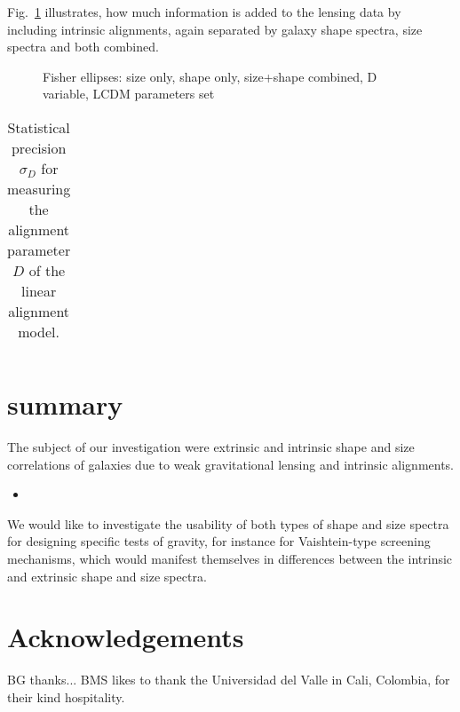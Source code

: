 \documentclass[a4paper,fleqn,usenatbib]{mnras}
\begin{document}
Fig.~\ref{fig:fisher2} illustrates, how much information is added to the lensing data by including intrinsic alignments, again separated by galaxy shape spectra, size spectra and both combined.

\begin{figure}
\centering
\caption{Fisher ellipses: size only, shape only, size+shape combined, D variable, LCDM parameters set}
\label{fig:fisher2}
\end{figure}


\begin{table}
\begin{center}
\begin{tabular}{cc}
\hline\hline\\
\hline
\end{tabular}
\caption{Statistical precision $\sigma_D$ for measuring the alignment parameter $D$ of the linear alignment model.}
\label{tab_precision}
\end{center}
\end{table}


\section{summary}\label{sect_summary}
The subject of our investigation were extrinsic and intrinsic shape and size correlations of galaxies due to weak gravitational lensing and intrinsic alignments. 
\begin{itemize}
\item{}
\end{itemize}
We would like to investigate the usability of both types of shape and size spectra for designing specific tests of gravity, for instance for Vaishtein-type screening mechanisms, which would manifest themselves in differences between the intrinsic and extrinsic shape and size spectra.


\section*{Acknowledgements}
BG thanks...   BMS likes to thank the Universidad del Valle in Cali, Colombia, for their kind hospitality.






\bsp
\label{lastpage}
\end{document}
